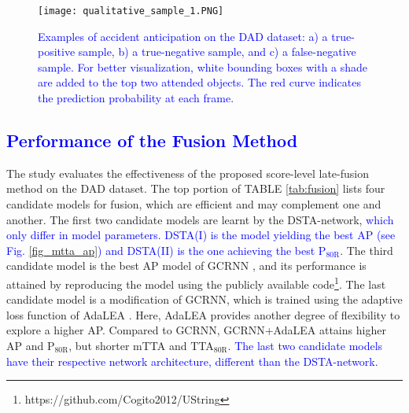 \documentclass[journal]{IEEEtran}
\begin{document}
\begin{figure*}[htbp]
\centering
\texttt{[image: qualitative\_sample\_1.PNG]}
\caption{\textcolor{blue}{Examples of accident anticipation on the DAD dataset: a) a true-positive sample, b) a true-negative sample, and c) a false-negative sample. For better visualization, white bounding boxes with a shade are added to the top two attended objects. The red curve indicates the prediction probability at each frame.}}
\label{fig_qualitative_1}
\end{figure*}


\subsection{\textcolor{blue}{Performance of the Fusion Method}}
\label{sub:fusion_result}
The study evaluates the effectiveness of the proposed score-level late-fusion method on the DAD dataset. The top portion of TABLE \ref{tab:fusion} lists four candidate models for fusion, which are efficient and may complement one and another. The first two candidate models are learnt by the DSTA-network, \textcolor{blue}{which only differ in model parameters. DSTA(I) is the model yielding the best AP (see Fig. \ref{fig_mtta_ap}) and DSTA(II) is the one achieving the best P$_{80\text{R}}$}. The third candidate model is the best AP model of GCRNN \cite{bao2020uncertainty}, and its performance is attained by reproducing the model using the publicly available code\footnote{https://github.com/Cogito2012/UString}. The last candidate model is a modification of GCRNN, which is trained using the adaptive loss function of AdaLEA \cite{suzuki2018anticipating}. Here, AdaLEA provides another degree of flexibility to explore a higher AP. Compared to GCRNN, GCRNN+AdaLEA attains higher AP and P$_{80\text{R}}$, but shorter mTTA and TTA$_{80\text{R}}$. \textcolor{blue}{The last two candidate models have their respective network architecture, different than the DSTA-network.}
\end{document}

